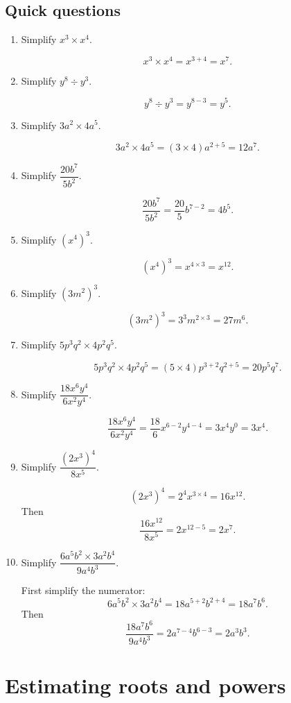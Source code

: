 \documentclass[11pt]{article}
\begin{document}
\subsection*{Quick questions}
\begin{enumerate}
\item Simplify $x^3\times x^4$.

\[
x^3\times x^4=x^{3+4}=x^7.
\]

\item Simplify $y^8\div y^3$.

\[
y^8\div y^3=y^{8-3}=y^5.
\]

\item Simplify $3a^2\times4a^5$.

\[
3a^2\times4a^5=(3\times4)a^{2+5}=12a^7.
\]

\item Simplify $\dfrac{20b^7}{5b^2}$.

\[
\frac{20b^7}{5b^2}=\frac{20}{5}b^{7-2}=4b^5.
\]

\item Simplify $\left(x^4\right)^3$.

\[
\left(x^4\right)^3=x^{4\times3}=x^{12}.
\]

\item Simplify $\left(3m^2\right)^3$.

\[
\left(3m^2\right)^3=3^3m^{2\times3}=27m^6.
\]

\item Simplify $5p^3q^2\times4p^2q^5$.

\[
5p^3q^2\times4p^2q^5=(5\times4)p^{3+2}q^{2+5}=20p^5q^7.
\]

\item Simplify $\dfrac{18x^6y^4}{6x^2y^4}$.

\[
\frac{18x^6y^4}{6x^2y^4}=\frac{18}{6}x^{6-2}y^{4-4}=3x^4y^0=3x^4.
\]

\item Simplify $\dfrac{\left(2x^3\right)^4}{8x^5}$.

\[
\left(2x^3\right)^4=2^4x^{3\times4}=16x^{12}.
\]
Then
\[
\frac{16x^{12}}{8x^5}=2x^{12-5}=2x^7.
\]

\item Simplify $\dfrac{6a^5b^2\times3a^2b^4}{9a^4b^3}$.

First simplify the numerator:
\[
6a^5b^2\times3a^2b^4=18a^{5+2}b^{2+4}=18a^7b^6.
\]
Then
\[
\frac{18a^7b^6}{9a^4b^3}=2a^{7-4}b^{6-3}=2a^3b^3.
\]
\end{enumerate}

\section{Estimating roots and powers}
\end{document}
